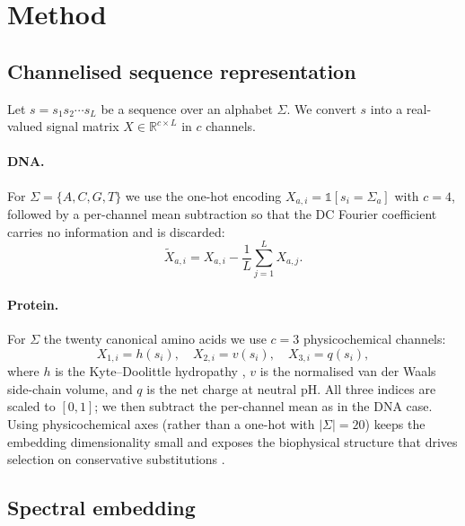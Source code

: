 \documentclass[twocolumn,11pt,a4paper]{article}
\theoremstyle{definition}
\theoremstyle{remark}
\newcommand{\R}{\mathbb{R}}
\begin{document}
\section{Method}
\label{sec:method}

\subsection{Channelised sequence representation}
\label{sec:method:channels}

Let $s = s_1 s_2 \cdots s_L$ be a sequence over an alphabet $\Sigma$. We
convert $s$ into a real-valued signal matrix $X \in \R^{c \times L}$ in $c$
channels.

\paragraph{DNA.} For $\Sigma = \{A, C, G, T\}$ we use the one-hot encoding
$X_{a,i} = \mathbb{1}[s_i = \Sigma_a]$ with $c = 4$, followed by a
per-channel mean subtraction so that the DC Fourier coefficient carries no
information and is discarded:
\begin{equation}
    \tilde{X}_{a,i} = X_{a,i} - \frac{1}{L} \sum_{j=1}^L X_{a,j}.
\end{equation}

\paragraph{Protein.} For $\Sigma$ the twenty canonical amino acids we use
$c = 3$ physicochemical channels:
\begin{equation}
    X_{1,i} = h(s_i), \quad X_{2,i} = v(s_i), \quad X_{3,i} = q(s_i),
\end{equation}
where $h$ is the Kyte--Doolittle hydropathy \citep{kyte1982}, $v$ is the
normalised van der Waals side-chain volume, and $q$ is the net charge at
neutral pH. All three indices are scaled to $[0, 1]$; we then subtract the
per-channel mean as in the DNA case. Using physicochemical axes (rather than
a one-hot with $|\Sigma| = 20$) keeps the embedding dimensionality small and
exposes the biophysical structure that drives selection on conservative
substitutions \citep{henikoff1992,dayhoff1978}.

\subsection{Spectral embedding}
\label{sec:method:embed}
\end{document}
